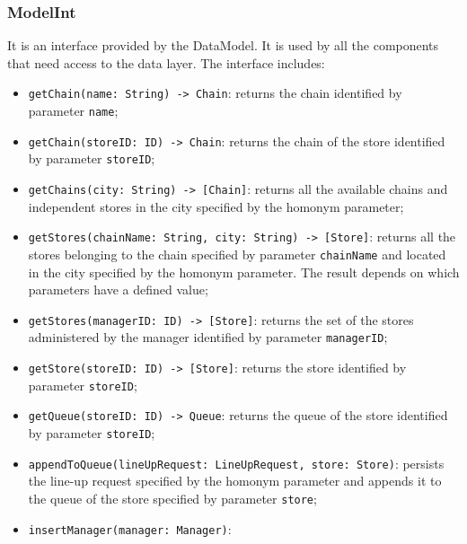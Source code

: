 \documentclass[a4paper,oneside,11pt]{book}
\newcommand{\red}[1]{\begingroup\color{punct}#1\endgroup}
\begin{document}
    \subsubsection{ModelInt}
    It is an interface provided by the DataModel. It is used by all the components that need access to the data layer. The interface includes:
    \begin{itemize}
       \item \texttt{getChain(name: \red{String}) -> \red{Chain}}: \newline returns the chain identified by parameter \texttt{name};
       \item \texttt{getChain(storeID: \red{ID}) -> \red{Chain}}: \newline 
       returns the chain of the store identified by parameter \texttt{storeID};
       \item \texttt{getChains(city: \red{String}) -> [\red{Chain}]}: \newline returns all the available chains and independent stores in the city specified by the homonym parameter;
       \item \texttt{getStores(chainName: \red{String}, city: \red{String}) -> [\red{Store}]}:\newline
       returns all the stores belonging to the chain specified by parameter \texttt{chainName} and located in the city specified by the homonym parameter. The result depends on which parameters have a defined value;
       \item \texttt{getStores(managerID: \red{ID}) -> [\red{Store}]}: \newline
       returns the set of the stores administered by the manager identified by parameter \texttt{managerID}; 
       \item \texttt{getStore(storeID: \red{ID}) -> [\red{Store}]}: \newline
       returns the store identified by parameter \texttt{storeID};
       \item \texttt{getQueue(storeID: \red{ID}) -> \red{Queue}}: \newline
       returns the queue of the store identified by parameter \texttt{storeID};
       \item \texttt{appendToQueue(lineUpRequest: \red{LineUpRequest}, store: \red{Store})}: \newline
       persists the line-up request specified by the homonym parameter and appends it to the queue of the store specified by parameter \texttt{store};
       \item \texttt{insertManager(manager: \red{Manager})}: \newline

\end{itemize}
\end{document}
